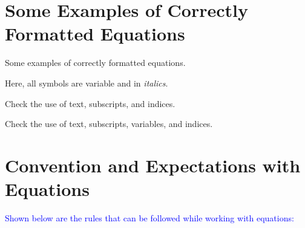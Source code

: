 \documentclass[phd,showframe]{ndsu-thesis-2022}
\newcommand\italk[1]{\textcolor{blue}{#1}}  %
\begin{document}
\section{Some Examples of Correctly Formatted Equations}

Some examples of correctly formatted equations. 


Here, all symbols are variable and in \textit{italics}.


Check the use of text, subscripts, and indices. 


Check the use of text, subscripts, variables, and indices. 

\mysectop
\section{Convention and Expectations with Equations}

\italk{Shown below are the rules that can be followed while working with equations:}
\end{document}
